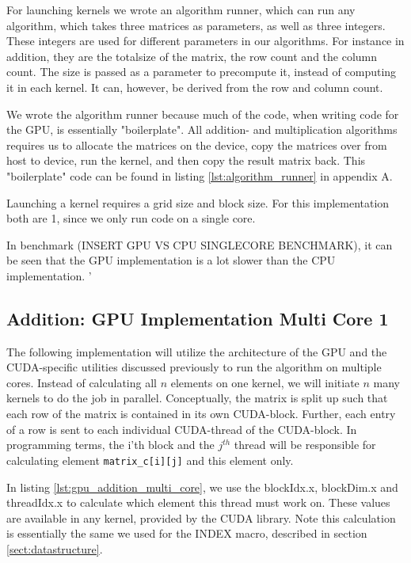 For launching kernels we wrote an algorithm runner, which can run any algorithm, which takes three matrices as parameters, as well as three integers. These integers are used for different parameters in our algorithms. For instance in addition, they are the totalsize of the matrix, the row count and the column count. The size is passed as a parameter to precompute it, instead of computing it in each kernel. It can, however, be derived from the row and column count. 

We wrote the algorithm runner because much of the code, when writing code for the GPU, is essentially "boilerplate". All addition- and multiplication algorithms requires us to allocate the matrices on the device, copy the matrices over from host to device, run the kernel, and then copy the result matrix back. This "boilerplate" code can be found in listing \ref{lst:algorithm_runner} in appendix A.

Launching a kernel requires a grid size and block size. For this implementation both are 1, since we only run code on a single core.

In benchmark (INSERT GPU VS CPU SINGLECORE BENCHMARK), it can be seen that the GPU implementation is a lot slower than the CPU implementation. '


\subsection{Addition: GPU Implementation Multi Core 1}
The following implementation will utilize the architecture of the GPU and the CUDA-specific utilities discussed previously to run the algorithm on multiple cores. Instead of calculating all $n$ elements on one kernel, we will initiate $n$ many kernels to do the job in parallel. Conceptually, the matrix is split up such that each row of the matrix is contained in its own CUDA-block. Further, each entry of a row is sent to each individual CUDA-thread of the CUDA-block. In programming terms, the i'th block and the $j^{th}$ thread will be responsible for calculating element \texttt{matrix\_c[i][j]} and this element only. 

In listing \ref{lst:gpu_addition_multi_core}, we use the blockIdx.x, blockDim.x and threadIdx.x to calculate which element this thread must work on. These values are available in any kernel, provided by the CUDA library. Note this calculation is essentially the same we used for the INDEX macro, described in section \ref{sect:datastructure}. 

